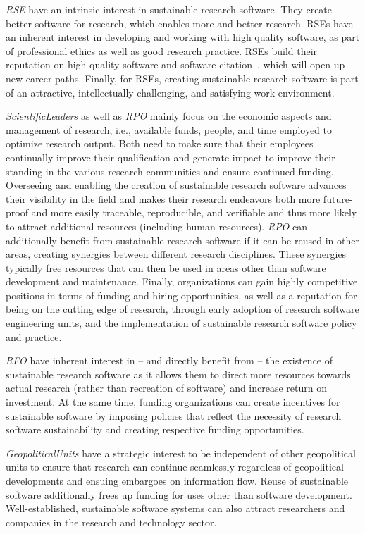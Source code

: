 \documentclass[a4paper,num-refs,numbers,sort&compress]{de-rse}
\begin{document}
\textit{\Gls{RSE}} have an intrinsic interest in
sustainable research software. They create better software for research, which enables more and better research. RSEs have an inherent interest in developing and working with high quality software, as part of professional ethics as well as good research practice. RSEs build their reputation on high quality software and software citation~\cite{smithSoftwareCitationPrinciples2016,druskatSoftwareDependenciesResearch2019}, which will open up new career paths.
Finally, for RSEs, creating sustainable research
software is part of an attractive, intellectually challenging, and
satisfying work environment.

\textit{\Gls{ScientificLeaders}} as well as \textit{\gls{RPO}} mainly focus on the economic aspects and management of research, i.e., available funds, people, and time employed to optimize research output.
Both need to make sure that their employees continually improve their qualification and generate impact to improve their standing in the various research communities and ensure continued funding.
Overseeing and enabling the creation of sustainable
research software advances their visibility in the field and makes
their research endeavors both more future-proof and more easily
traceable, reproducible, and verifiable and thus more likely to attract additional resources (including human resources). \textit{\Gls{RPO}} can additionally benefit from sustainable research software if it can be reused in other areas, creating synergies between different research disciplines.
These synergies typically free resources that can then be used in areas other than software development and maintenance.
Finally, organizations can gain
highly competitive positions in terms of funding and hiring opportunities, as well as a reputation for being on the cutting edge of research, through early adoption of research software
engineering units, and the implementation of sustainable research software
policy and practice.

\textit{\Gls{RFO}} have inherent interest in -- and directly benefit from -- the existence of sustainable research software as it allows them to direct more resources towards actual research (rather than recreation of software) and increase return on investment.
At the same time, funding organizations can create incentives for sustainable software by imposing policies that reflect the necessity of research software sustainability and creating respective funding opportunities.

\textit{\Gls{GeopoliticalUnits}} have a strategic interest to be independent of other geopolitical units to ensure that research can continue seamlessly regardless of geopolitical developments and ensuing embargoes on information flow.
Reuse of sustainable software additionally frees up funding for uses other than software development.
Well-established, sustainable software systems can also attract researchers and companies in the research and technology sector.
\end{document}
